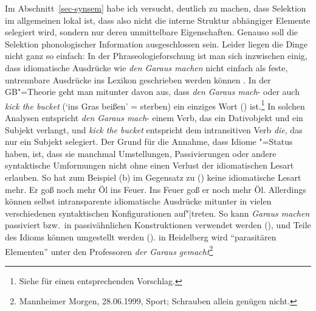 %
Im Abschnitt~\ref{sec-synsem} habe ich versucht, deutlich zu machen, dass Selektion im allgemeinen
lokal ist, dass also nicht die interne Struktur abhängiger Elemente selegiert
wird, sondern nur deren unmittelbare Eigenschaften. Genauso soll die Selektion phonologischer
Information ausgeschlossen sein. Leider liegen die Dinge nicht ganz so einfach:
In der Phraseologieforschung ist man sich inzwischen einig, dass idiomatische Ausdrücke wie
\emph{den Garaus machen} nicht einfach als feste, untrennbare Ausdrücke ins Lexikon geschrieben werden
können \citep*{NSW94a,Burger98a}. In der GB"=Theorie geht man mitunter davon aus, dass \emph{den Garaus mach}- oder
auch \emph{kick the bucket} (`ins Gras beißen' = sterben) ein einziges Wort (\vnull) ist.\footnote{
  Siehe \zb {} für einen entsprechenden Vorschlag.%
}
In solchen Analysen entspricht \emph{den Garaus mach}- einem Verb, das ein Dativobjekt und ein Subjekt verlangt,
und \emph{kick the bucket} entspricht dem intransitiven Verb \emph{die}, das nur ein Subjekt
selegiert. Der Grund für die Annahme, dass Idiome \vnull"=Status haben, ist, dass sie manchmal
Umstellungen, Passivierungen oder andere syntaktische Umformungen nicht ohne einen Verlust der
idiomatischen Lesart erlauben. So hat zum Beispiel (b) im Gegensatz zu () keine
idiomatische Lesart mehr.
\eal
\ex Er goß noch mehr Öl ins Feuer.
\ex Ins Feuer goß er noch mehr Öl.
\zl
Allerdings können selbst intransparente idiomatische Ausdrücke mitunter in vielen verschiedenen syntaktischen Konfigurationen auf"|treten.
So kann \emph{Garaus machen} \zb passiviert bzw.\ in passivähnlichen Konstruktionen
verwendet werden (), und Teile des Idioms können umgestellt werden ().
\ea
in Heidelberg wird "`parasitären Elementen"' unter den Professoren \emph{der Garaus gemacht}\footnote{
Mannheimer Morgen, 28.06.1999, Sport; Schrauben allein genügen nicht.%
}
\z

